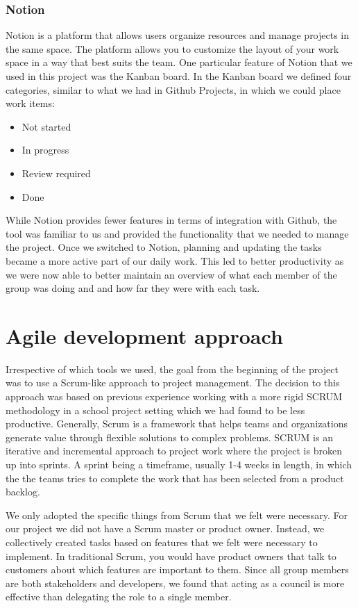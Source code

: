 \subsubsection{Notion}
Notion is a platform that allows users organize resources and manage projects in the same space. The platform allows you to customize the layout of your work space in a way that best suits the team. One particular feature of Notion that we used in this project was the Kanban board. In the Kanban board we defined four categories, similar to what we had in Github Projects, in which we could place work items:

\begin{itemize}
    \item Not started
    \item In progress
    \item Review required
    \item Done
\end{itemize}

While Notion provides fewer features in terms of integration with Github, the tool was familiar to us and provided the functionality that we needed to manage the project.
Once we switched to Notion, planning and updating the tasks became a more active part of our daily work. This led to better productivity as we were now able to better maintain an overview of what each member of the group was doing and and how far they were with each task.

\section{Agile development approach} \label{sec:agile-dev}
Irrespective of which tools we used, the goal from the beginning of the project was to use a Scrum-like approach to project management.
The decision to this approach was based on previous experience working with a more rigid SCRUM methodology in a school project setting which we had found to be less productive.
Generally, Scrum is a framework that helps teams and organizations generate value through flexible solutions to complex problems. SCRUM is an iterative and incremental approach to project work where the project is broken up into sprints. A sprint being a timeframe, usually 1-4 weeks in length, in which the the teams tries to complete the work that has been selected from a product backlog.

We only adopted the specific things from Scrum that we felt were necessary. For our project we did not have a Scrum master or product owner. Instead, we collectively created tasks based on features that we felt were necessary to implement.
In traditional Scrum, you would have product owners that talk to customers about which features are important to them. Since all group members are both stakeholders and developers, we found that acting as a council is more effective than delegating the role to a single member.

